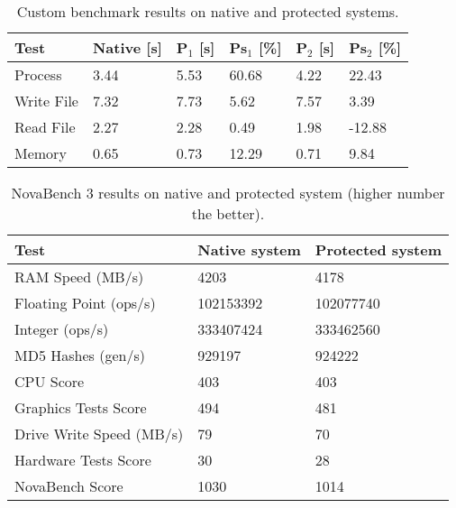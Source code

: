 \documentclass[10pt,twocolumn,a4paper]{article}
\begin{document}
\begin{table}[!h]
  \centering
  \caption{Custom benchmark results on native and protected systems.}
    \begin{tabular}{|p{1.6cm}|p{0.9cm}|p{0.6cm}|p{0.7cm}|p{0.6cm}|p{1cm}|}
    \addlinespace
    \toprule
    Test  & Native [s] & P$_{1}$ [s] & Ps$_{1}$ [\%] & P$_{2}$ [s] & Ps$_{2}$ [\%] \\
    \midrule
    Process & 3.44  & 5.53  & 60.68 & 4.22  & 22.43 \\
    \hline
    Write File & 7.32  & 7.73  & 5.62  & 7.57  & 3.39 \\
    \hline
    Read File & 2.27  & 2.28  & 0.49  & 1.98  & -12.88 \\
    \hline
    Memory & 0.65  & 0.73  & 12.29 & 0.71  & 9.84 \\
    \bottomrule
    \end{tabular}\label{tab:nasz_benchmark}\end{table}




\begin{table}[htbp]
  \centering
  \caption{NovaBench 3 results on native and protected system (higher number the better).}
    \begin{tabular}{|p{3.5cm}|p{1.5cm}|p{1.6cm}|}
    \addlinespace
    \toprule
    Test  &  Native system & Protected system \\
    \midrule
    RAM Speed (MB/s) & 4203  & 4178 \\
    \hline
    Floating Point (ops/s) & 102153392 & 102077740 \\
    \hline
    Integer (ops/s) & 333407424 & 333462560 \\
    \hline
    MD5 Hashes (gen/s) & 929197 & 924222 \\
    \hline
    CPU Score & 403   & 403 \\
    \hline
    Graphics Tests Score & 494   & 481 \\
    \hline
    Drive Write Speed (MB/s) & 79    & 70 \\
    \hline
    Hardware Tests Score & 30    & 28 \\
    \hline
    NovaBench Score & 1030  & 1014 \\
    \bottomrule
    \end{tabular}\label{tab:novabench}\end{table}
\end{document}
